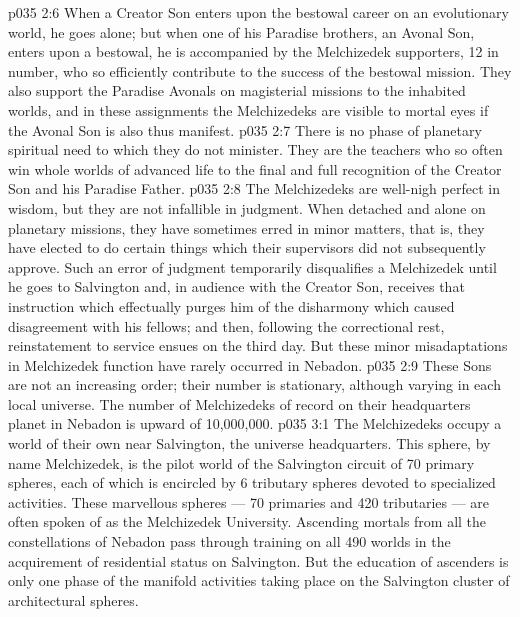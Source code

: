 \vs p035 2:6 When a Creator Son enters upon the bestowal career on an evolutionary world, he goes alone; but when one of his Paradise brothers, an Avonal Son, enters upon a bestowal, he is accompanied by the Melchizedek supporters, 12 in number, who so efficiently contribute to the success of the bestowal mission. They also support the Paradise Avonals on magisterial missions to the inhabited worlds, and in these assignments the Melchizedeks are visible to mortal eyes if the Avonal Son is also thus manifest.
\vs p035 2:7 There is no phase of planetary spiritual need to which they do not minister. They are the teachers who so often win whole worlds of advanced life to the final and full recognition of the Creator Son and his Paradise Father.
\vs p035 2:8 \pc The Melchizedeks are well\hyp{}nigh perfect in wisdom, but they are not infallible in judgment. When detached and alone on planetary missions, they have sometimes erred in minor matters, that is, they have elected to do certain things which their supervisors did not subsequently approve. Such an error of judgment temporarily disqualifies a Melchizedek until he goes to Salvington and, in audience with the Creator Son, receives that instruction which effectually purges him of the disharmony which caused disagreement with his fellows; and then, following the correctional rest, reinstatement to service ensues on the third day. But these minor misadaptations in Melchizedek function have rarely occurred in Nebadon.
\vs p035 2:9 These Sons are not an increasing order; their number is stationary, although varying in each local universe. The number of Melchizedeks of record on their headquarters planet in Nebadon is upward of 10,000,000.
\vs p035 3:1 The Melchizedeks occupy a world of their own near Salvington, the universe headquarters. This sphere, by name Melchizedek, is the pilot world of the Salvington circuit of 70 primary spheres, each of which is encircled by 6 tributary spheres devoted to specialized activities. These marvellous spheres --- 70 primaries and 420 tributaries --- are often spoken of as the Melchizedek University. Ascending mortals from all the constellations of Nebadon pass through training on all 490 worlds in the acquirement of residential status on Salvington. But the education of ascenders is only one phase of the manifold activities taking place on the Salvington cluster of architectural spheres.
